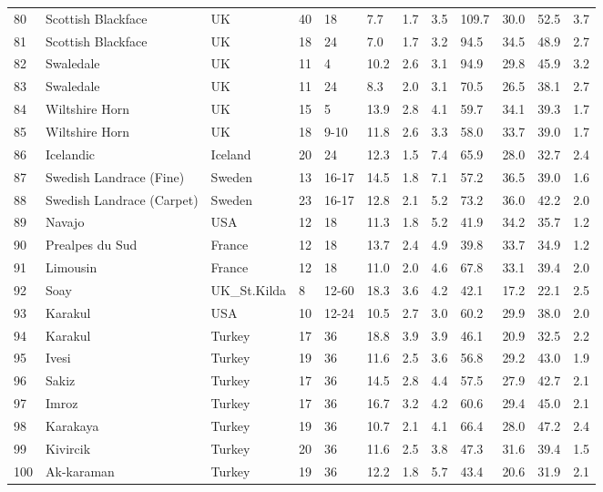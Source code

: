 \begin{center}
\begin{landscape}
\begin{longtable}{|p{0.4in}|p{0.9in}|p{0.7in}|p{0.5in}|p{0.5in}|p{0.5in}|p{0.5in}|p{0.5in}|p{0.5in}|p{0.5in}|p{0.5in}|p{0.5in}|}
 80 &  Scottish Blackface &  UK & 40 &  18 & 7.7 & 1.7 & 3.5 & 109.7 & 30.0 & 52.5 & 3.7 \\ 
 81 &  Scottish Blackface &  UK & 18 &  24 & 7.0 & 1.7 & 3.2 & 94.5 & 34.5 & 48.9 & 2.7 \\ 
 82 &  Swaledale &  UK & 11 &  4 & 10.2 & 2.6 & 3.1 & 94.9 & 29.8 & 45.9 & 3.2 \\ 
 83 &  Swaledale &  UK & 11 &  24 & 8.3 & 2.0 & 3.1 & 70.5 & 26.5 & 38.1 & 2.7 \\ 
 84 &  Wiltshire Horn &  UK & 15 &  5 & 13.9 & 2.8 & 4.1 & 59.7 & 34.1 & 39.3 & 1.7 \\ 
 85 &  Wiltshire Horn &  UK & 18 &  9-10 & 11.8 & 2.6 & 3.3 & 58.0 & 33.7 & 39.0 & 1.7 \\ 
 86 &  Icelandic &  Iceland & 20 &  24 & 12.3 & 1.5 & 7.4 & 65.9 & 28.0 & 32.7 & 2.4 \\ 
 87 &  Swedish Landrace (Fine) &  Sweden & 13 &  16-17 & 14.5 & 1.8 & 7.1 & 57.2 & 36.5 & 39.0 & 1.6 \\ 
 88 &  Swedish Landrace (Carpet) &  Sweden & 23 &  16-17 & 12.8 & 2.1 & 5.2 & 73.2 & 36.0 & 42.2 & 2.0 \\ 
 89 &  Navajo &  USA & 12 &  18 & 11.3 & 1.8 & 5.2 & 41.9 & 34.2 & 35.7 & 1.2 \\ 
 90 &  Prealpes du Sud &  France & 12 &  18 & 13.7 & 2.4 & 4.9 & 39.8 & 33.7 & 34.9 & 1.2 \\ 
 91 &  Limousin &  France & 12 &  18 & 11.0 & 2.0 & 4.6 & 67.8 & 33.1 & 39.4 & 2.0 \\ 
 92 &  Soay &  UK\_St.Kilda &  8 &  12-60 & 18.3 & 3.6 & 4.2 & 42.1 & 17.2 & 22.1 & 2.5 \\ 
 93 &  Karakul &  USA & 10 &  12-24 & 10.5 & 2.7 & 3.0 & 60.2 & 29.9 & 38.0 & 2.0 \\ 
 94 &  Karakul &  Turkey & 17 &  36 & 18.8 & 3.9 & 3.9 & 46.1 & 20.9 & 32.5 & 2.2 \\ 
 95 &  Ivesi &  Turkey & 19 &  36 & 11.6 & 2.5 & 3.6 & 56.8 & 29.2 & 43.0 & 1.9 \\ 
 96 &  Sakiz &  Turkey & 17 &  36 & 14.5 & 2.8 & 4.4 & 57.5 & 27.9 & 42.7 & 2.1 \\ 
 97 &  Imroz &  Turkey & 17 &  36 & 16.7 & 3.2 & 4.2 & 60.6 & 29.4 & 45.0 & 2.1 \\ 
 98 &  Karakaya &  Turkey & 19 &  36 & 10.7 & 2.1 & 4.1 & 66.4 & 28.0 & 47.2 & 2.4 \\ 
 99 &  Kivircik &  Turkey & 20 &  36 & 11.6 & 2.5 & 3.8 & 47.3 & 31.6 & 39.4 & 1.5 \\ 
 100 &  Ak-karaman &  Turkey & 19 &  36 & 12.2 & 1.8 & 5.7 & 43.4 & 20.6 & 31.9 & 2.1 \\ 

\end{longtable}
\end{landscape}
\end{center}
